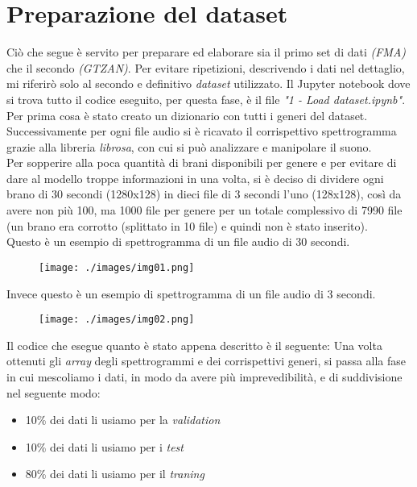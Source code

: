 \section{Preparazione del dataset}
Ciò che segue è servito per preparare ed elaborare sia il primo set di dati \textit{(FMA)} che il secondo \textit{(GTZAN)}. Per evitare ripetizioni, descrivendo i dati nel dettaglio, mi riferirò solo al secondo e definitivo \textit{dataset} utilizzato. Il Jupyter notebook dove si trova tutto il codice eseguito, per questa fase, è il file \textit{"1 - Load dataset.ipynb"}.\\
\newline
Per prima cosa è stato creato un dizionario con tutti i generi del dataset. Successivamente per ogni file audio si è ricavato il corrispettivo spettrogramma grazie alla libreria \textit{librosa}, con cui si può analizzare e manipolare il suono.\\ Per sopperire alla poca quantità di brani disponibili per genere e per evitare  di dare al modello troppe informazioni in una volta, si è deciso di dividere ogni brano di 30 secondi (1280x128) in dieci file di 3 secondi l'uno (128x128), così da avere non più 100, ma 1000 file per genere per un totale complessivo di 7990 file (un brano era corrotto (splittato in 10 file) e quindi non è stato inserito).\\
\newline Questo è un esempio di spettrogramma di un file audio di 30 secondi.
\begin{figure}[H]
	\centering
	\texttt{[image: ./images/img01.png]}
\end{figure}
\noindent Invece questo è un esempio di spettrogramma di un file audio di 3 secondi.
\begin{figure}[H]
	\centering
	\texttt{[image: ./images/img02.png]}
\end{figure}
\noindent Il codice che esegue quanto è stato appena descritto è il seguente:
\vspace*{2ex}
\vspace*{2ex}
\noindent Una volta ottenuti gli \textit{array} degli spettrogrammi e dei corrispettivi generi, si passa alla fase in cui mescoliamo i dati, in modo da avere più imprevedibilità, e di suddivisione nel seguente modo:
\begin{itemize}
	\item 10\% dei dati li usiamo per la \textit{validation}
	\item 10\% dei dati li usiamo per i \textit{test}
	\item 80\% dei dati li usiamo per il \textit{traning}
\end{itemize}
